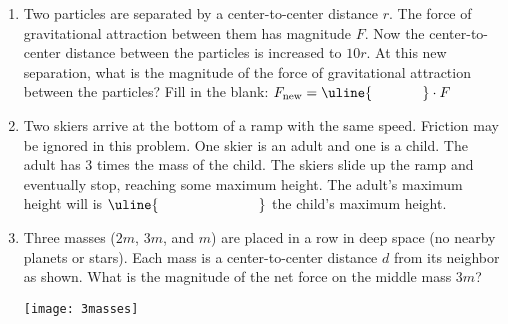 \documentclass[11pt]{article}
\begin{document}
\begin{enumerate}
\item Two particles are separated by a center-to-center distance $r$. The force of gravitational attraction between them has magnitude $F$. Now the center-to-center distance between the particles is increased to $10r$. At this new separation, what is the magnitude of the force of gravitational attraction between the particles? Fill in the blank: $F_\text{new}=\uline{\hspace{.5in}}\cdot F$

\item Two skiers arrive at the bottom of a ramp with the same speed. Friction may be ignored in this problem. One skier is an adult and one is a child. The adult has 3 times the mass of the child. The skiers slide up the ramp and eventually stop, reaching some maximum height. The adult's maximum height will is $\uline{\hspace{1in}}$ the child's maximum height.

\vspace{.5in}

\newpage

\item Three masses ($2m$, $3m$, and $m$) are placed in a row in deep space (no nearby planets or stars). Each mass is a center-to-center distance $d$ from its neighbor as shown. What is the magnitude of the net force on the middle mass $3m$?\\
\begin{minipage}[t]{.5\lw}
\end{minipage}\hfill
\begin{minipage}[t]{.45\lw}
\vspace{0in}
\flushright
\texttt{[image: 3masses]}
\end{minipage}


\end{enumerate}
\end{document}
